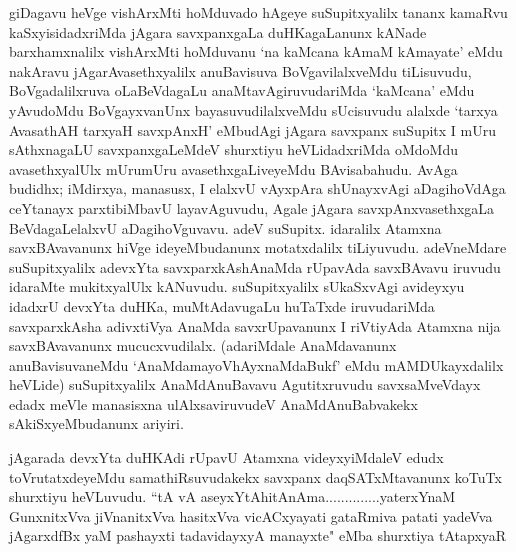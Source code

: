 \begin{artha}
giDagavu heVge vishArxMti hoMduvado hAgeye suSupitxyalilx tananx kamaRvu kaSxyisidadxriMda jAgara savxpanxgaLa duHKagaLanunx kANade barxhamxnalilx vishArxMti hoMduvanu `na kaMcana kAmaM kAmayate' eMdu nakAravu jAgarAvasethxyalilx anuBavisuva BoVgavilalxveMdu tiLisuvudu, BoVgadalilxruva oLaBeVdagaLu anaMtavAgiruvudariMda `kaMcana' eMdu yAvudoMdu BoVgayxvanUnx bayasuvudilalxveMdu sUcisuvudu alalxde `tarxya AvasathAH tarxyaH savxpAnxH' eMbudAgi jAgara savxpanx suSupitx I mUru sAthxnagaLU savxpanxgaLeMdeV shurxtiyu heVLidadxriMda oMdoMdu avasethxyalUlx mUrumUru avasethxgaLiveyeMdu BAvisabahudu. AvAga budidhx; iMdirxya, manasusx, I elalxvU vAyxpAra shUnayxvAgi aDagihoVdAga ceYtanayx parxtibiMbavU layavAguvudu, Agale jAgara savxpAnxvasethxgaLa BeVdagaLelalxvU aDagihoVguvavu. adeV suSupitx. idaralilx Atamxna savxBAvavanunx hiVge ideyeMbudanunx motatxdalilx tiLiyuvudu. adeVneMdare suSupitxyalilx adevxYta savxparxkAshAnaMda rUpavAda savxBAvavu iruvudu idaraMte mukitxyalUlx kANuvudu. suSupitxyalilx sUkaSxvAgi avideyxyu idadxrU devxYta duHKa, muMtAdavugaLu huTaTxde iruvudariMda savxparxkAsha adivxtiVya AnaMda savxrUpavanunx I riVtiyAda Atamxna nija savxBAvavanunx mucucxvudilalx. (adariMdale AnaMdavanunx anuBavisuvaneMdu `AnaMdamayoVhAyxnaMdaBukf' eMdu mAMDUkayxdalilx heVLide) suSupitxyalilx AnaMdAnuBavavu Agutitxruvudu savxsaMveVdayx edadx meVle manasisxna ulAlxsaviruvudeV AnaMdAnuBabvakekx sAkiSxyeMbudanunx ariyiri. 
\end{artha}


\begin{artha}
jAgarada devxYta duHKAdi rUpavU Atamxna videyxyiMdaleV edudx toVrutatxdeyeMdu samathiRsuvudakekx savxpanx daqSATxMtavanunx koTuTx shurxtiyu heVLuvudu. ``tA vA aseyxYtAhitAnAma..............yaterxYnaM GunxnitxVva jiVnanitxVva hasitxVva vicACxyayati gataRmiva patati yadeVva jAgarxdfBx yaM pashayxti tadavidayxyA manayxte" eMba shurxtiya tAtapxyaR
\end{artha}

